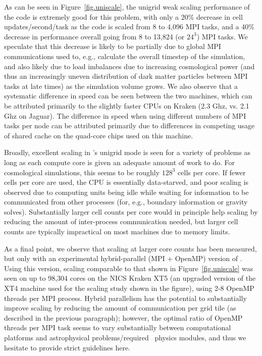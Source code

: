 As can be seen in Figure~\ref{fig.uniscale}, the unigrid weak scaling
performance of the code is extremely good for this problem, with only
a 20\% decrease in cell updates/second/task as the code is scaled from
8 to 4,096 MPI tasks, and a 40\% decrease in performance overall going
from 8 to 13,824 (or $24^3$) MPI tasks.  We speculate that this
decrease is likely to be partially due to global MPI communications
used to, e.g., calculate the overall timestep of the simulation, and
also likely due to load imbalances due to increasing cosmological
power (and thus an increasingly uneven distribution of dark matter
particles between MPI tasks at late times) as the simulation volume
grows.  We also observe that a systematic difference in speed can be
seen between the two machines, which can be attributed primarily to
the slightly faster CPUs on Kraken (2.3 Ghz, vs. 2.1 Ghz on Jaguar).
The difference in speed when using different numbers of MPI tasks per
node can be attributed primarily due to differences in competing usage
of shared cache on the quad-core chips used on this machine.

Broadly, excellent scaling in \enzo's unigrid mode is seen for a
variety of problems as long as each compute core is given an adequate
amount of work to do.  For cosmological simulations, this seems to be
roughly $128^3$ cells per core.  If fewer cells per core are used, the
CPU is essentially data-starved, and poor scaling is observed due to
computing units being idle while waiting for information to be
communicated from other processes (for, e.g., boundary information or
gravity solves).  Substantially larger cell counts per core would in
principle help scaling by reducing the amount of inter-process
communication needed, but larger cell counts are typically impractical
on most machines due to memory limits.

As a final point, we observe that scaling at larger core counts has
been measured, but only with an experimental hybrid-parallel (MPI +
OpenMP) version of \enzo.  Using this version, scaling comparable to
that shown in Figure~\ref{fig.uniscale} was seen on up to 98,304 cores
on the NICS Kraken XT5 (an upgraded version of the XT4 machine used
for the scaling study shown in the figure), using 2-8 OpenMP threads
per MPI process.  Hybrid parallelism has the potential to
substantially improve scaling by reducing the amount of communication
per grid tile (as described in the previous paragraph); however, the
optimal ratio of OpenMP threads per MPI task seems to vary
substantially between computational platforms and astrophysical
problems/required \enzo\ physics modules, and thus we hesitate to
provide strict guidelines here.

